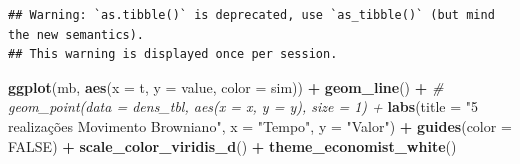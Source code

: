 \documentclass[]{book}
\newenvironment{Shaded}{\begin{snugshade}}{\end{snugshade}}
\newcommand{\KeywordTok}[1]{\textcolor[rgb]{0.13,0.29,0.53}{\textbf{#1}}}
\newcommand{\DataTypeTok}[1]{\textcolor[rgb]{0.13,0.29,0.53}{#1}}
\newcommand{\DecValTok}[1]{\textcolor[rgb]{0.00,0.00,0.81}{#1}}
\newcommand{\StringTok}[1]{\textcolor[rgb]{0.31,0.60,0.02}{#1}}
\newcommand{\CommentTok}[1]{\textcolor[rgb]{0.56,0.35,0.01}{\textit{#1}}}
\newcommand{\OtherTok}[1]{\textcolor[rgb]{0.56,0.35,0.01}{#1}}
\newcommand{\ControlFlowTok}[1]{\textcolor[rgb]{0.13,0.29,0.53}{\textbf{#1}}}
\newcommand{\OperatorTok}[1]{\textcolor[rgb]{0.81,0.36,0.00}{\textbf{#1}}}
\newcommand{\NormalTok}[1]{#1}
\begin{document}
\begin{Shaded}
\end{Shaded}

\begin{verbatim}
## Warning: `as.tibble()` is deprecated, use `as_tibble()` (but mind the new semantics).
## This warning is displayed once per session.
\end{verbatim}

\begin{Shaded}
\begin{Highlighting}[]
\KeywordTok{ggplot}\NormalTok{(mb, }\KeywordTok{aes}\NormalTok{(}\DataTypeTok{x =}\NormalTok{ t, }\DataTypeTok{y =}\NormalTok{ value, }\DataTypeTok{color =}\NormalTok{ sim)) }\OperatorTok{+}\StringTok{ }
\StringTok{  }\KeywordTok{geom_line}\NormalTok{() }\OperatorTok{+}
\CommentTok{#  geom_point(data = dens_tbl, aes(x = x, y = y), size = 1) +}
\StringTok{  }\KeywordTok{labs}\NormalTok{(}\DataTypeTok{title =} \StringTok{"5 realizações Movimento Browniano"}\NormalTok{,}
       \DataTypeTok{x =} \StringTok{"Tempo"}\NormalTok{,}
       \DataTypeTok{y =} \StringTok{"Valor"}\NormalTok{) }\OperatorTok{+}
\StringTok{  }\KeywordTok{guides}\NormalTok{(}\DataTypeTok{color =} \OtherTok{FALSE}\NormalTok{) }\OperatorTok{+}
\StringTok{  }\KeywordTok{scale_color_viridis_d}\NormalTok{() }\OperatorTok{+}
\StringTok{  }\KeywordTok{theme_economist_white}\NormalTok{()}
\end{Highlighting}
\end{Shaded}
\end{document}
